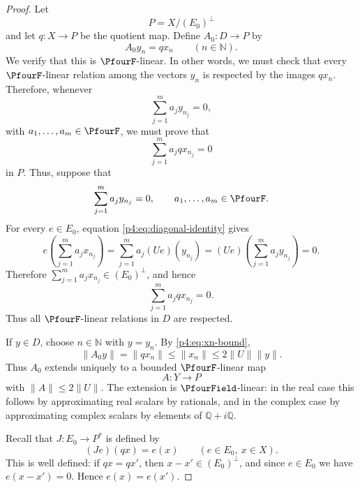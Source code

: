 \documentclass[11pt,reqno]{amsart}
\makeatletter
\theoremstyle{plain}
\theoremstyle{definition}
\newcommand{\N}{\mathbb N}
\newcounter{problempaper}
\newenvironment{problempaperbody}{%
  \setcounter{subsection}{0}%
  \setcounter{subsubsection}{0}%
  \setcounter{paragraph}{0}%
  \renewcommand{\thesubsection}{\arabic{subsection}}%
  \renewcommand{\thesubsubsection}{\thesubsection.\arabic{subsubsection}}%
  \renewcommand{\theparagraph}{\thesubsubsection.\arabic{paragraph}}%
  \let\problem@outersection\section
  \let\problem@outersubsection\subsection
  \let\problem@outersubsubsection\subsubsection
  \let\problem@outerparagraph\paragraph
  \let\section\problem@papersection
  \let\subsection\problem@papersubsection
  \let\subsubsection\problem@papersubsubsection
}{%
  \let\section\problem@outersection
  \let\subsection\problem@outersubsection
  \let\subsubsection\problem@outersubsubsection
  \let\paragraph\problem@outerparagraph
}
\newcommand{\problem@target}[2]{%
  \hypertarget{problem-\theproblempaper-#1-#2}{}%
}
\newcommand{\problem@paperheading}[3]{%
  \par\bigskip
  \problem@target{#1}{#2}%
  \noindent{\large\bfseries #2.\quad #3\par}%
  \nobreak\smallskip
}
\newcommand{\problem@papersubheading}[3]{%
  \par\medskip
  \problem@target{#1}{#2}%
  \noindent{\normalsize\bfseries #2.\quad #3\par}%
  \nobreak\smallskip
}
\newcommand{\problem@papersubsubheading}[3]{%
  \par\smallskip
  \problem@target{#1}{#2}%
  \noindent{\normalsize\itshape #2.\quad #3.\ }%
}
\def\problem@papersection{%
  \@ifstar{\problem@papersectionstar}{\problem@papersectionnostar}%
}
\def\problem@papersectionstar#1{%
  \par\bigskip\noindent{\large\bfseries #1\par}\nobreak\smallskip
}
\def\problem@papersectionnostar#1{%
  \refstepcounter{subsection}%
  \setcounter{subsubsection}{0}%
  \setcounter{paragraph}{0}%
  \problem@paperheading{section}{\thesubsection}{#1}%
  \problem@writecontentsline{section}{\thesubsection}{#1}%
}
\def\problem@papersubsection{%
  \@ifstar{\problem@papersubsectionstar}{\problem@papersubsectionnostar}%
}
\def\problem@papersubsectionstar#1{%
  \par\medskip\noindent{\normalsize\bfseries #1\par}\nobreak\smallskip
}
\def\problem@papersubsectionnostar#1{%
  \refstepcounter{subsubsection}%
  \setcounter{paragraph}{0}%
  \problem@papersubheading{subsection}{\thesubsubsection}{#1}%
  \problem@writecontentsline{subsection}{\thesubsubsection}{#1}%
}
\def\problem@papersubsubsection{%
  \@ifstar{\problem@papersubsubsectionstar}{\problem@papersubsubsectionnostar}%
}
\def\problem@papersubsubsectionstar#1{%
  \par\smallskip\noindent{\normalsize\itshape #1.\ }%
}
\def\problem@papersubsubsectionnostar#1{%
  \refstepcounter{paragraph}%
  \problem@papersubsubheading{subsubsection}{\theparagraph}{#1}%
  \problem@writecontentsline{subsubsection}{\theparagraph}{#1}%
}
\newcommand{\problem@writecontentsline}[3]{%
  \begingroup
  \protected@write\@auxout{}{%
    \string\problemcontentsentry{\theproblempaper}{#1}{#2}{#3}{\thepage}%
  }%
  \endgroup
}
\newcommand{\problemcontentsentry}[5]{%
  \@ifundefined{problemcontents@#1}{%
    \expandafter\gdef\csname problemcontents@#1\endcsname{}%
  }{}%
  \expandafter\g@addto@macro\csname problemcontents@#1\endcsname{%
    \problemcontentsline{#1}{#2}{#3}{#4}{#5}%
  }%
}
\newcommand{\problemcontentslink}[4]{%
  \hyperlink{problem-#1-#2-#3}{#4}%
}
\newcommand{\problemcontentsline}[5]{%
  \ifstrequal{#2}{section}{%
    \par\noindent
    \problemcontentslink{#1}{#2}{#3}{\makebox[2.5em][l]{#3}#4}%
    \nobreak\dotfill
    \problemcontentslink{#1}{#2}{#3}{#5}\par
  }{%
    \ifstrequal{#2}{subsection}{%
      \par\noindent\hspace*{1.5em}%
      \problemcontentslink{#1}{#2}{#3}{\makebox[3.5em][l]{#3}#4}%
      \nobreak\dotfill
      \problemcontentslink{#1}{#2}{#3}{#5}\par
    }{%
      \par\noindent\hspace*{3em}%
      \problemcontentslink{#1}{#2}{#3}{\makebox[4.5em][l]{#3}#4}%
      \nobreak\dotfill
      \problemcontentslink{#1}{#2}{#3}{#5}\par
    }%
  }%
}
\makeatother
\begin{document}
\begin{problempaperbody}
\begin{proof}
Let
\begin{equation*}
        P=X/(E_0)^\perp
\end{equation*}
and let $q\colon X\to P$ be the quotient map. Define $A_0 \colon D\to P$ by
\begin{equation}
\label{p4:eq:A0-definition}
        A_0y_n=qx_n \qquad(n\in\N).
\end{equation}
We verify that this is $\PfourF$-linear. In other words, we must check that every $\PfourF$-linear relation among the vectors $y_n$ is respected by the images $qx_n$. Therefore, whenever
\begin{equation*}
        \sum_{j=1}^{m}a_jy_{n_j}=0,
\end{equation*}
with $a_1,\ldots,a_m\in\PfourF$, we must prove that
\begin{equation*}
        \sum_{j=1}^{m}a_jqx_{n_j}=0
\end{equation*}
in $P$. Thus, suppose that
\begin{equation*}
        \sum_{j=1}^{m}a_jy_{n_j}=0, \qquad a_1,\ldots,a_m\in\PfourF.
\end{equation*}
For every $e\in E_0$, equation \eqref{p4:eq:diagonal-identity} gives
\begin{equation*}
        e\left(\sum_{j=1}^{m}a_jx_{n_j}\right)=\sum_{j=1}^{m}a_j(Ue)(y_{n_j})=(Ue)\left(\sum_{j=1}^{m}a_jy_{n_j}\right)=0.
\end{equation*}
Therefore $\sum_{j=1}^{m}a_jx_{n_j}\in(E_0)^\perp$, and hence
\begin{equation*}
        \sum_{j=1}^{m}a_jqx_{n_j}=0.
\end{equation*}
Thus all $\PfourF$-linear relations in $D$ are respected.

If $y\in D$, choose $n\in\N$ with $y=y_n$. By \eqref{p4:eq:xn-bound},
\begin{equation*}
        \|A_0y\|=\|qx_n\|\leq \|x_n\|\leq 2\|U\|\|y\|.
\end{equation*}
Thus $A_0$ extends uniquely to a bounded $\PfourF$-linear map
\begin{equation*}
        A \colon Y\to P
\end{equation*}
with $\|A\|\leq 2\|U\|$. The extension is $\PfourField$-linear: in the real case this follows by approximating real scalars by rationals, and in the complex case by approximating complex scalars by elements of $\mathbb Q+i\mathbb Q$.

Recall that $J\colon E_0\to P^*$ is defined by
\begin{equation*}
        (Je)(qx)=e(x) \qquad(e\in E_0,\ x\in X).
\end{equation*}
This is well defined: if $qx=qx'$, then $x-x'\in(E_0)^\perp$, and since $e\in E_0$ we have $e(x-x')=0$. Hence $e(x)=e(x')$.


\end{proof}
\end{problempaperbody}
\end{document}
